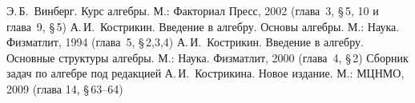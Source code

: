 \documentclass[a4paper,10pt]{amsart}
\theoremstyle{definition}
\theoremstyle{remark}
\begin{document}
\bigskip

\begin{thebibliography}{99}
Э.\,Б.~Винберг. Курс алгебры. М.: Факториал Пресс, 2002 (глава~3,
\S\,5, 10 и глава~9, \S\,5)
А.\,И.~Кострикин. Введение в алгебру. Основы алгебры. М.: Наука.
Физматлит, 1994 (глава~5, \S\,2,3,4)
А.\,И.~Кострикин. Введение в алгебру. Основные структуры алгебры.
М.: Наука. Физматлит, 2000 (глава~4, \S\,2)
Сборник задач по алгебре под редакцией А.\,И.~Кострикина. Новое
издание. М.: МЦНМО, 2009 (глава 14, \S\,63--64)
\end{thebibliography}
\end{document}
